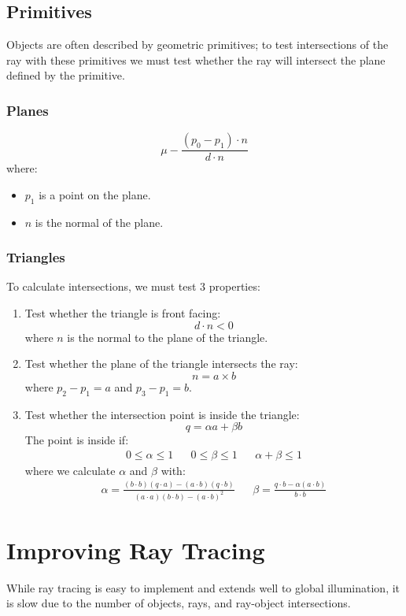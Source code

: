 \documentclass[11pt]{article}
\begin{document}
\subsection{Primitives}
Objects are often described by geometric primitives; to test intersections of the ray with these primitives we must test whether the ray will intersect the plane defined by the primitive.

\subsubsection{Planes}
\[
  \mu - \frac{(p_0 - p_1) \cdot n}{d \cdot n} 
\]
where:
\begin{itemize}
  \item $p_1$ is a point on the plane.
  \item $n$ is the normal of the plane.
\end{itemize}

\subsubsection{Triangles}
To calculate intersections, we must test 3 properties:
\begin{enumerate}
  \item Test whether the triangle is front facing:
    \[
      d \cdot n < 0 
    \]
    where $n$ is the normal to the plane of the triangle.
  \item Test whether the plane of the triangle intersects the ray:
    \[
      n = a \times b
    \]
    where $p_2 - p_1 = a$ and $p_3 - p_1 = b$.
  \item Test whether the intersection point is inside the triangle:
    \[
      q = \alpha a + \beta b
    \]
    The point is inside if:
    \begin{align*}
      0 \leq \alpha \leq 1 && 0 \leq \beta \leq 1 && \alpha + \beta \leq 1
    \end{align*}
    where we calculate $\alpha$ and $\beta$ with:
    \begin{align*}
      \alpha = \frac{(b \cdot b)(q \cdot a) - (a \cdot b)(q \cdot b)}{(a \cdot a)(b \cdot b) - (a \cdot b)^2}
      &&
      \beta = \frac{q \cdot b - \alpha(a \cdot b)}{b \cdot b}
    \end{align*}
\end{enumerate}

\section{Improving Ray Tracing}
While ray tracing is easy to implement and extends well to global illumination, it is slow due to the number of objects, rays, and ray-object intersections.
\end{document}
